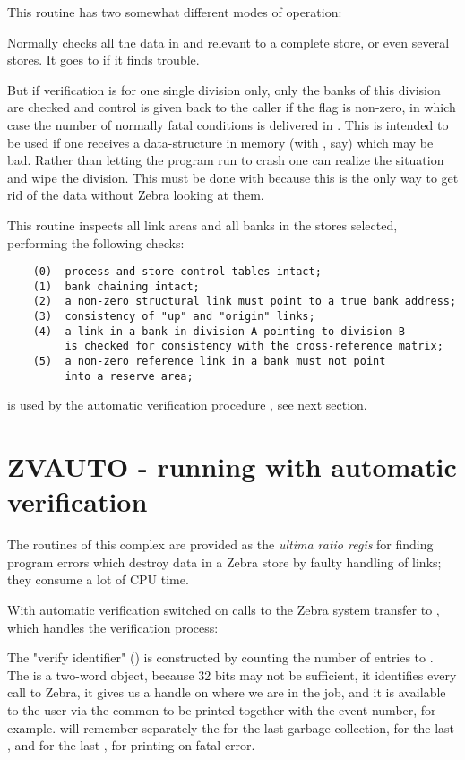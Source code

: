 This routine has two somewhat different modes of operation:

Normally  checks all the data in and relevant to a complete
store, or even several stores. It goes to  if it finds
trouble.

But if verification is for one single division only, only the banks
of this division are checked and control is given back to the caller
if the flag  is non-zero, in which case the number of
normally fatal conditions is delivered in .
This is intended to be used if one receives a data-structure
in memory (with , say) which may be bad. Rather than letting
the program run to crash one can realize the situation and
wipe the division. This must be done with  because this
is the only way to get rid of the data without Zebra looking
at them.

This routine inspects all link areas and all banks in the stores
selected, performing the following checks:

\begin{verbatim}
    (0)  process and store control tables intact;
    (1)  bank chaining intact;
    (2)  a non-zero structural link must point to a true bank address;
    (3)  consistency of "up" and "origin" links;
    (4)  a link in a bank in division A pointing to division B
         is checked for consistency with the cross-reference matrix;
    (5)  a non-zero reference link in a bank must not point
         into a reserve area;
\end{verbatim} 

 is used by the automatic verification procedure
, see next section.

\section{ZVAUTO - running with automatic verification}

The routines of this complex are provided as the {\it ultima ratio regis}
for finding program errors which destroy data in a Zebra store
by faulty handling of links; they consume a lot of CPU time.

With automatic verification switched on calls to the Zebra system
transfer to ,
which handles the verification process:

The "verify identifier" () is constructed by counting the number
of entries to . 
The  is a two-word object, because 32 bits
may not be sufficient, it identifies every call to Zebra, it gives
us a handle on where we are in the job, and it is available to the
user via the common  to be printed together with the event
number, for example. 
 will remember separately the  for the
last garbage collection, for the last , and for the last ,
for printing on fatal error.

